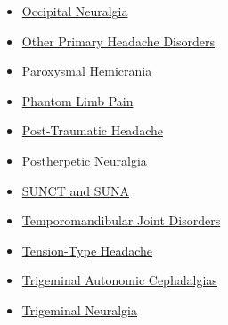 \begin{itemize}[noitemsep]
  \item \hyperlink{sec:Occipital Neuralgia}{Occipital Neuralgia}
  \item \hyperlink{sec:Other Primary Headache Disorders}{Other Primary Headache Disorders}
  \item \hyperlink{sec:Paroxysmal Hemicrania}{Paroxysmal Hemicrania}
  \item \hyperlink{sec:Phantom Limb Pain}{Phantom Limb Pain}
  \item \hyperlink{sec:Post-Traumatic Headache}{Post-Traumatic Headache}
  \item \hyperlink{sec:Postherpetic Neuralgia}{Postherpetic Neuralgia}
  \item \hyperlink{sec:SUNCT SUNA}{SUNCT and SUNA}
  \item \hyperlink{sec:Temporomandibular Joint Disorders}{Temporomandibular Joint Disorders}
  \item \hyperlink{sec:Tension-Type Headache}{Tension-Type Headache}
  \item \hyperlink{sec:Trigeminal Autonomic Cephalalgias}{Trigeminal Autonomic Cephalalgias}
  \item \hyperlink{sec:Trigeminal Neuralgia}{Trigeminal Neuralgia}
\end{itemize}

